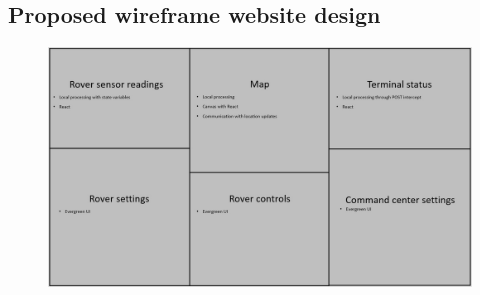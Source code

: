 \documentclass[11pt, a4paper]{article}
\begin{document}
\subsection{Proposed wireframe website design}

\begin{figure} [h!]
    \centering
    \includegraphics[scale=0.5]{Wireframe.JPG}
\end{figure}

\pagebreak
\end{document}
